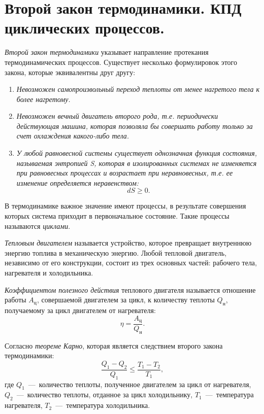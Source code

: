 
\chapter{Второй закон термодинамики. КПД циклических процессов.}

\emph{Второй закон термодинамики} указывает направление протекания
термодинамических процессов. Существует несколько формулировок этого
закона, которые эквивалентны друг другу:
\begin{enumerate}
  \item \emph{Невозможен самопроизвольный переход теплоты от менее нагретого
  тела к более нагретому.}
  \item \emph{Невозможен вечный двигатель второго рода, т.е. периодически
  действующая машина, которая позволяла бы совершать работу только за счет
  охлаждения какого-либо тела.}
  \item \emph{У любой равновесной системы существует однозначная функция
  состояния, называемая энтропией S, которая в изолированных системах не
  изменяется при равновесных процессах и возрастает при неравновесных,
  т.е. ее изменение определяется неравенством:}
  \begin{equation}
    dS \geqslant  0.
  \end{equation}
\end{enumerate}

В термодинамике важное значение имеют процессы, в результате совершения
которых система приходит в первоначальное состояние. Такие процессы
называются \emph{циклами}.

\emph{Тепловым двигателем} называется устройство, которое превращает
внутреннюю энергию топлива в механическую энергию. Любой тепловой
двигатель, независимо от его конструкции, состоит из трех основных
частей: рабочего тела, нагревателя и холодильника.

\emph{Коэффициентом полезного действия} теплового двигателя называется
отношение работы $A_\text{ц}$, совершаемой двигателем за
цикл, к количеству теплоты $Q_\text{н}$, получаемому за
цикл двигателем от нагревателя:
\begin{equation}
  \eta = \frac{A_\text{ц}}{Q_\text{н}}.
\end{equation}

Согласно \emph{теореме Карно}, которая является следствием второго
закона термодинамики: 
\begin{equation}
  \frac{Q_1 - Q_2}{Q_1} \leqslant \frac{T_1 - T_2}{T_1},
\end{equation}
где $Q_1$~---~количество теплоты, полученное
двигателем за цикл от нагревателя,
$Q_2$~---~количество теплоты, отданное за цикл
холодильнику,
$T_1$~---~температура нагревателя,
$T_2$~---~температура холодильника.

